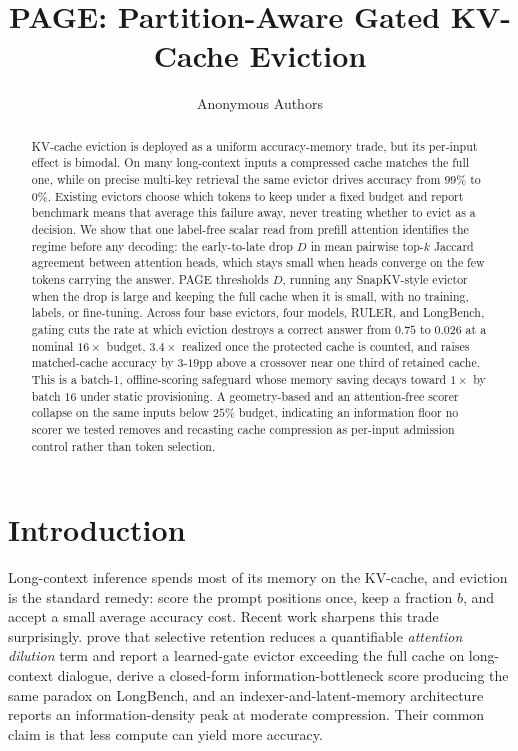 \documentclass{article}
\title{PAGE: Partition-Aware Gated KV-Cache Eviction}
\author{%
  Anonymous Authors%
}
\newcommand{\method}{PAGE\xspace}
\begin{document}
\maketitle

\begin{abstract}
KV-cache eviction is deployed as a uniform accuracy-memory trade, but its per-input effect is bimodal. On many long-context inputs a compressed cache
matches the full one, while on precise multi-key retrieval the same evictor
drives accuracy from $99\%$ to $0\%$. Existing evictors choose which tokens to
keep under a fixed budget and report benchmark means that average this failure
away, never treating whether to evict as a decision. We show that one label-free scalar read from prefill attention identifies the regime before any
decoding: the early-to-late drop $D$ in mean pairwise top-$k$ Jaccard
agreement between attention heads, which stays small when heads converge on
the few tokens carrying the answer. \method thresholds $D$, running any
SnapKV-style evictor when the drop is large and keeping the full cache when it
is small, with no training, labels, or fine-tuning. Across four base evictors,
four models, RULER, and LongBench, gating cuts the rate at which eviction
destroys a correct answer from $0.75$ to $0.026$ at a nominal $16\times$
budget, $3.4\times$ realized once the protected cache is counted, and raises
matched-cache accuracy by $3$-$19$pp above a crossover near one third of
retained cache. This is a batch-1, offline-scoring safeguard whose memory
saving decays toward $1\times$ by batch $16$ under static provisioning. A
geometry-based and an attention-free scorer collapse on the same inputs below
$25\%$ budget, indicating an information floor no scorer we tested removes and
recasting cache compression as per-input admission control rather than token
selection.
\end{abstract}

\section{Introduction}
\label{sec:intro}

Long-context inference spends most of its memory on the KV-cache, and eviction
is the standard remedy: score the prompt positions once, keep a fraction $b$,
and accept a small average accuracy cost. Recent work sharpens this trade
surprisingly. \citet{arxiv260509649} prove that selective retention
reduces a quantifiable \emph{attention dilution} term and report a learned-gate evictor exceeding the full cache on long-context dialogue,
\citet{arxiv260425975} derive a closed-form information-bottleneck score
producing the same paradox on LongBench, and an indexer-and-latent-memory
architecture~\citep{arxiv260525475} reports an information-density peak at
moderate compression. Their common claim is that less compute can yield more
accuracy.
\end{document}
